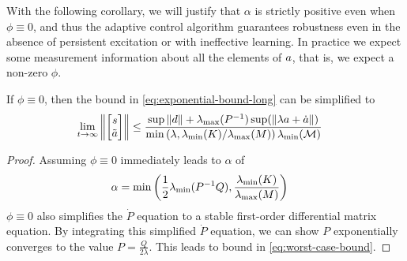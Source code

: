 With the following corollary, we will justify that $\alpha$ is strictly positive even when $\phi\equiv0$, and thus the adaptive control algorithm guarantees robustness even in the absence of persistent excitation or with ineffective learning.
In practice we expect some measurement information about all the elements of $ a$, that is, we expect a non-zero $\phi$. 
\begin{corollary}
If $\phi\equiv0$, then the bound in \cref{eq:exponential-bound-long} can be simplified to
\begin{align}
    \label{eq:worst-case-bound}
    \lim_{t\rightarrow\infty}\left\| \stackedstate \right\| &\leq \frac{
        \sup\|\BB d\| + %
        \lammax(P\inv)\sup(\|\lambda \BB a + \dot{\BB a}\|)
    }{
        \min\left(\lambda, \lammin(K)/\lammax(M)\right)\lammin(\metric)
    }
\end{align}
\end{corollary}
\begin{proof}
Assuming $\phi\equiv0$ immediately leads to $\alpha$ of
\begin{align}
    \alpha &= \min\left(\frac{1}{2} \lambda_\text{\normalfont{min}}( P^{-1} Q ), \frac{\lambda_\text{\normalfont{min}}(K)}{\lambda_\text{\normalfont{max}}(M)}\right)
\end{align}
$\phi\equiv0$ also simplifies the $\dot{P}$ equation to a stable first-order differential matrix equation. By integrating this simplified $\dot{P}$ equation, we can show $P$ exponentially converges to the value $P=\frac{Q}{2\lambda}$. This leads to bound in \cref{eq:worst-case-bound}.

\end{proof}


